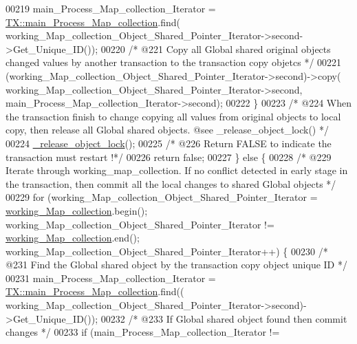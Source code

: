\begin{DoxyCode}
00219             main\_Process\_Map\_collection\_Iterator  = 
      \hyperlink{class_t_x_a1a45d726894190695314464d7cd97c29_a1a45d726894190695314464d7cd97c29}{TX::main\_Process\_Map\_collection}.find(
      working\_Map\_collection\_Object\_Shared\_Pointer\_Iterator->second->Get\_Unique\_ID());
00220             \textcolor{comment}{/* @221 Copy all Global shared original objects changed values by another transaction to the
       transaction copy objetcs */}
00221             (working\_Map\_collection\_Object\_Shared\_Pointer\_Iterator->second)->copy(
      working\_Map\_collection\_Object\_Shared\_Pointer\_Iterator->second, main\_Process\_Map\_collection\_Iterator->second);
00222         \}
00223         \textcolor{comment}{/* @224 When the transaction finish to change copying all values from original objects to local
       copy, then release all Global shared objects. @see \_release\_object\_lock() */}
00224         \hyperlink{class_t_x_a4c13d2015dc15d0f788fa9a1413f0463_a4c13d2015dc15d0f788fa9a1413f0463}{\_release\_object\_lock}();
00225         \textcolor{comment}{/* @226 Return FALSE to indicate the transaction must restart !*/}
00226         \textcolor{keywordflow}{return} \textcolor{keyword}{false};
00227     \} \textcolor{keywordflow}{else} \{
00228         \textcolor{comment}{/* @229 Iterate through working\_map\_collection. If no conflict detected in early stage in the
       transaction, then commit all the local changes to shared Global objects */}
00229         \textcolor{keywordflow}{for} (working\_Map\_collection\_Object\_Shared\_Pointer\_Iterator = 
      \hyperlink{class_t_x_a81aafda16e2f20e36ec6c68e584668ff_a81aafda16e2f20e36ec6c68e584668ff}{working\_Map\_collection}.begin(); working\_Map\_collection\_Object\_Shared\_Pointer\_Iterator
       != \hyperlink{class_t_x_a81aafda16e2f20e36ec6c68e584668ff_a81aafda16e2f20e36ec6c68e584668ff}{working\_Map\_collection}.end(); 
      working\_Map\_collection\_Object\_Shared\_Pointer\_Iterator++) \{
00230                 \textcolor{comment}{/* @231 Find the Global shared object by the transaction copy object unique ID */}
00231                 main\_Process\_Map\_collection\_Iterator = 
      \hyperlink{class_t_x_a1a45d726894190695314464d7cd97c29_a1a45d726894190695314464d7cd97c29}{TX::main\_Process\_Map\_collection}.find((
      working\_Map\_collection\_Object\_Shared\_Pointer\_Iterator->second)->Get\_Unique\_ID());
00232                 \textcolor{comment}{/* @233 If Global shared object found then commit changes */}
00233                 \textcolor{keywordflow}{if} (main\_Process\_Map\_collection\_Iterator != 

\end{DoxyCode}
